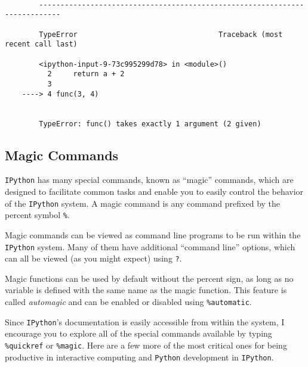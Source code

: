 \documentclass{article}
\begin{document}
    \begin{Verbatim}[commandchars=\\\{\}]

        ---------------------------------------------------------------------------

        TypeError                                 Traceback (most recent call last)

        <ipython-input-9-73c995299d78> in <module>()
          2     return a + 2
          3 
    ----> 4 func(3, 4)
    

        TypeError: func() takes exactly 1 argument (2 given)

    \end{Verbatim}

    \subsection{Magic Commands}\label{magic-commands}

\texttt{IPython} has many special commands, known as ``magic'' commands,
which are designed to facilitate common tasks and enable you to easily
control the behavior of the \texttt{IPython} system. A magic command is
any command prefixed by the percent symbol \texttt{\%}.

Magic commands can be viewed as command line programs to be run within
the \texttt{IPython} system. Many of them have additional ``command
line'' options, which can all be viewed (as you might expect) using
\texttt{?}.

Magic functions can be used by default without the percent sign, as long
as no variable is defined with the same name as the magic function. This
feature is called \emph{automagic} and can be enabled or disabled using
\texttt{\%automatic}.

Since \texttt{IPython}'s documentation is easily accessible from within
the system, I encourage you to explore all of the special commands
available by typing \texttt{\%quickref} or \texttt{\%magic}. Here are a
few more of the most critical ones for being productive in interactive
computing and \texttt{Python} development in \texttt{IPython}.
\end{document}
